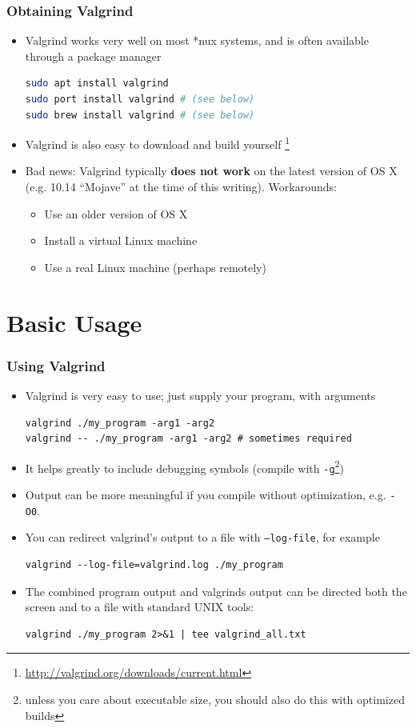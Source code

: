 \documentclass{beamer}
\begin{document}
\begin{frame}[fragile]
\frametitle{Obtaining Valgrind}
\begin{itemize}
\item Valgrind works very well on most *nux systems, and is often available through a package manager
\begin{lstlisting}[language=bash]
sudo apt install valgrind
sudo port install valgrind # (see below)
sudo brew install valgrind # (see below)
\end{lstlisting}
\item Valgrind is also easy to download and build yourself \footnote{\url{http://valgrind.org/downloads/current.html}}
\item Bad news: Valgrind typically {\bf does not work} on the latest version of OS X (e.g. 10.14 ``Mojave'' at the time of this writing). Workarounds:
\begin{itemize}
\item Use an older version of OS X
\item Install a virtual Linux machine
\item Use a real Linux machine (perhaps remotely)
\end{itemize}
\end{itemize}
\end{frame}

\section{Basic Usage}

\begin{frame}[fragile]
\frametitle{Using Valgrind}
\begin{itemize}
\item Valgrind is very easy to use; just supply your program, with arguments
\begin{lstlisting}
valgrind ./my_program -arg1 -arg2
valgrind -- ./my_program -arg1 -arg2 # sometimes required
\end{lstlisting}
\item It helps greatly to include debugging symbols (compile with \texttt{-g}\footnote{unless you care about executable size, you should also do this with optimized builds})
\item Output can be more meaningful if you compile without optimization, e.g. \texttt{-O0}.
\item You can redirect valgrind's output to a file with \texttt{--log-file}, for example
  \begin{lstlisting}
valgrind --log-file=valgrind.log ./my_program
  \end{lstlisting}
\item The combined program output and valgrinds output can be directed both the screen and to a file with standard UNIX tools:
  \begin{lstlisting}
valgrind ./my_program 2>&1 | tee valgrind_all.txt
  \end{lstlisting}
\end{itemize}
\end{frame}
\end{document}
